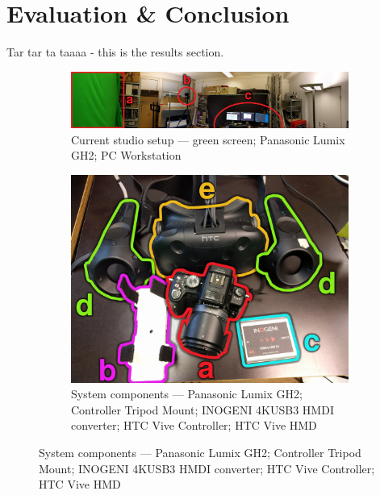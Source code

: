 %
\chapter{Evaluation \& Conclusion}

Tar tar ta taaaa - this is the results section.


\begin{figure}[htbp]
	\caption{System Setup}
	\label{fig:eval:results}
	\centering
	\begin{subfigure}[t]{\textwidth}
		\centering
		\includegraphics[width=\textwidth]{gfx/results/pano.png}
		\caption{Current studio setup ---  green screen; 
			 Panasonic Lumix GH2;  PC Workstation}
	\end{subfigure}
	\begin{subfigure}[t]{.49\textwidth}
		\centering
		\includegraphics[width=\textwidth]{gfx/results/camera.png}
		\caption{System components ---  Panasonic Lumix GH2; 
			 Controller Tripod Mount;  INOGENI 4KUSB3 
			HMDI 
			converter;  HTC Vive Controller;  HTC Vive 
			HMD}
	\end{subfigure}
	\hfill

\end{figure}
